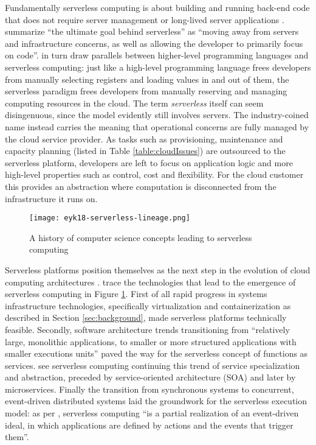 Fundamentally serverless computing is about building and running back-end code that does not require server management or long-lived server applications \parencite{robert2016serverlessarchitectures}. \textcite{sbarski2017serverless} summarize ``the ultimate goal behind serverless'' as ``moving away from servers and infrastructure concerns, as well as allowing the developer to primarily focus on code''. \textcite{jonas19berkeleyView} in turn draw parallels between higher-level programming languages and serverless computing: just like a high-level programming language frees developers from manually selecting registers and loading values in and out of them, the serverless paradigm frees developers from manually reserving and managing computing resources in the cloud. The term \textit{serverless} itself can seem disingenuous, since the model evidently still involves servers. The industry-coined name instead carries the meaning that operational concerns are fully managed by the cloud service provider. As tasks such as provisioning, maintenance and capacity planning (listed in Table \ref{table:cloudIssues}) are outsourced to the serverless platform, developers are left to focus on application logic and more high-level properties such as control, cost and flexibility. For the cloud customer this provides an abstraction where computation is disconnected from the infrastructure it runs on.

\begin{figure}[h]
  \centering
  \texttt{[image: eyk18-serverless-lineage.png]}
  \caption{A history of computer science concepts leading to serverless computing \parencite{van18fromPAAStoPresent}}
  \label{fig:serverlessLineage}
\end{figure}

Serverless platforms position themselves as the next step in the evolution of cloud computing architectures \parencite{baldini17currentTrends}. \textcite{van18fromPAAStoPresent} trace the technologies that lead to the emergence of serverless computing in Figure \ref{fig:serverlessLineage}. First of all rapid progress in systems infrastructure technologies, specifically virtualization and containerization as described in Section \ref{sec:background}, made serverless platforms technically feasible. Secondly, software architecture trends transitioning from ``relatively large, monolithic applications, to smaller or more structured applications with smaller executions units'' \parencite{van2017spec} paved the way for the serverless concept of functions as services. \textcite{van18fromPAAStoPresent} see serverless computing continuing this trend of service specialization and abstraction, preceded by service-oriented architecture (SOA) and later by microservices. Finally the transition from synchronous systems to concurrent, event-driven distributed systems laid the groundwork for the serverless execution model: as per \textcite{mcgrath17implement}, serverless computing ``is a partial realization of an event-driven ideal, in which applications are defined by actions and the events that trigger them''.

